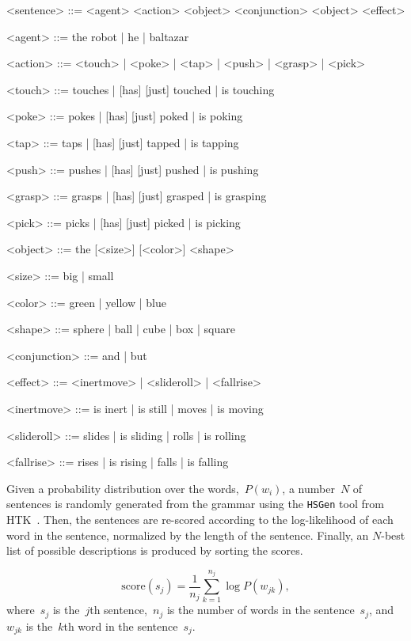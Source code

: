\begin{grammar}
  <sentence> ::= <agent> <action> <object> <conjunction> <object> <effect>

  <agent> ::= the robot | he | baltazar 

  <action> ::= <touch> | <poke> | <tap> | <push> | <grasp> | <pick>

  <touch> ::= touches | [has] [just] touched | is touching

  <poke> ::= pokes | [has] [just] poked | is poking

  <tap> ::= taps | [has] [just] tapped | is tapping

  <push> ::= pushes | [has] [just] pushed | is pushing

  <grasp> ::= grasps | [has] [just] grasped | is grasping

  <pick> ::= picks | [has] [just] picked | is picking

  <object> ::= the [<size>] [<color>] <shape>

  <size> ::= big | small
  
  <color> ::= green | yellow | blue
  
  <shape> ::= sphere | ball | cube | box | square

  <conjunction> ::= and | but

  <effect> ::= <inertmove> | <slideroll> | <fallrise>

  <inertmove> ::= is inert | is still | moves | is moving

  <slideroll> ::= slides | is sliding | rolls | is rolling

  <fallrise> ::= rises | is rising | falls | is falling
\end{grammar}

Given a probability distribution over the words,~$P(w_i)$, a number~$N$ of sentences is randomly generated from the grammar using the \texttt{HSGen} tool from HTK~\cite{young:htkbook}.
Then, the sentences are re-scored according to the log-likelihood of each word in the sentence, normalized by the length of the sentence.
Finally, an $N$-best list of possible descriptions is produced by sorting the scores.

\begin{equation*}
  \text{score}(s_j) = \frac{1}{n_j} \sum_{k=1}^{n_j} \log P(w_{jk}),
\end{equation*}
where~$s_j$ is the~$j$th sentence,~$n_j$ is the number of words in the sentence~$s_j$, and~$w_{jk}$ is the~$k$th word in the sentence~$s_j$.
